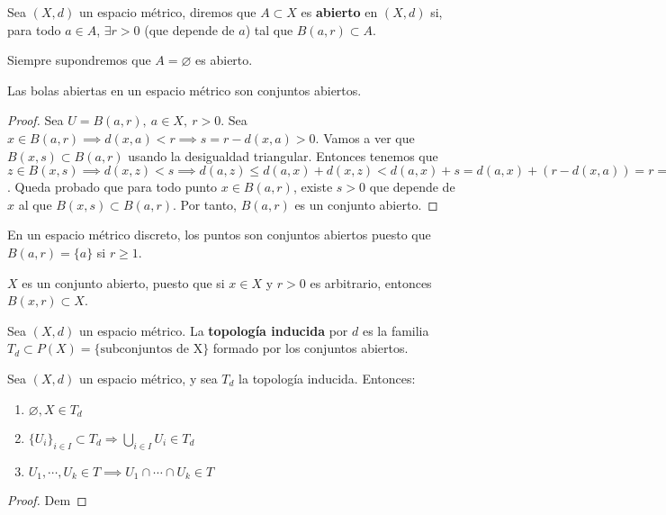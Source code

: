 \begin{ndef}[Abierto]
  Sea $(X,d)$ un espacio métrico, diremos que $A \subset X$ es \textbf{abierto} en $(X,d)$ si, para todo $a \in A$, $\exists r > 0$ (que depende de $a$) tal que $B(a,r) \subset A$.
\end{ndef}
\begin{note}
    Siempre supondremos que $A = \varnothing$ es abierto.
\end{note}
\begin{properties}
  Las bolas abiertas en un espacio métrico son conjuntos abiertos.
\end{properties}
\begin{proof}
  Sea $U=B(a,r),\ a \in X,\ r>0$. Sea $x \in B(a,r) \implies d(x,a)<r \implies s=r-d(x,a)>0$. Vamos a ver que $B(x,s) \subset B(a,r)$ usando la desigualdad triangular. Entonces tenemos que $z \in B(x,s) \implies d(x,z)<s \implies d(a,z) \leq d(a,x) + d(x,z)<d(a,x)+s=d(a,x)+(r-d(x,a))=r \implies z \in B(a,r) \implies B(x,s) \subset B(a,r)$. Queda probado que para todo punto $x \in B(a,r)$, existe $s>0$ que depende de $x$ al que $B(x,s) \subset B(a,r)$. Por tanto, $B(a,r)$ es un conjunto abierto.
\end{proof}
\begin{exmp}
  En un espacio métrico discreto, los puntos son conjuntos abiertos puesto que $B(a,r)=\{a\}$ si $r \geq 1$.
\end{exmp}
\begin{exmp}
  $X$ es un conjunto abierto, puesto que si $x \in X$ y $r>0$ es arbitrario, entonces $B(x,r) \subset X$.
\end{exmp}

\begin{ndef}
    Sea $(X,d)$ un espacio métrico. La \textbf{topología inducida} por $d$ es la familia $T_d \subset P(X) = \{\text{subconjuntos de X} \}$ formado por los conjuntos abiertos.
\end{ndef}
\begin{nprop}
  Sea $(X,d)$ un espacio métrico, y sea $T_d$ la topología inducida. Entonces:
  \begin{enumerate}
    \item $\varnothing ,X \in T_d$
    \item $\{U_i\}_{i \in I} \subset T_d \Rightarrow \bigcup_{i \in I} U_i \in T_d$
    \item $U_1, \cdots, U_k \in T \implies U_1 \cap \cdots \cap U_k \in T$
  \end{enumerate}
\end{nprop}
\begin{proof}
  Dem
\end{proof}

